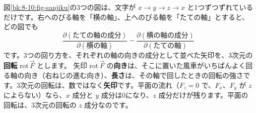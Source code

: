図\ref{bk:8-10:fig-sanjiku}の3つの図は、文字が $x\to y\to z\to x$ と1つずつずれているだけです。右へのびる軸を「横の軸」、上へのびる軸を「たての軸」とすると、どの図でも
\[ \frac{\partial(\text{たての軸の成分})}{\partial(\text{横の軸})}-\frac{\partial(\text{横の軸の成分})}{\partial(\text{たての軸})} \]
です。3つの回り方を、それぞれの軸の向きの成分として並べた矢印を、3次元の\textbf{回転} $\mathrm{rot}\,\vec F$ とします。
矢印 $\mathrm{rot}\,\vec F$ の\textbf{向き}は、そこに置いた風車がいちばんよく回る軸の向き（右ねじの進む向き）、\textbf{長さ}は、その軸で回したときの回転の強さです。3次元の回転は、数ではなく\textbf{矢印}です。平面の流れ（$F_z=0$ で、$F_x$、$F_y$ が $z$ によらない）なら、$x$ 成分と $y$ 成分は0になり、$z$ 成分だけが残ります。平面の回転は、3次元の回転の $z$ 成分なのです。

